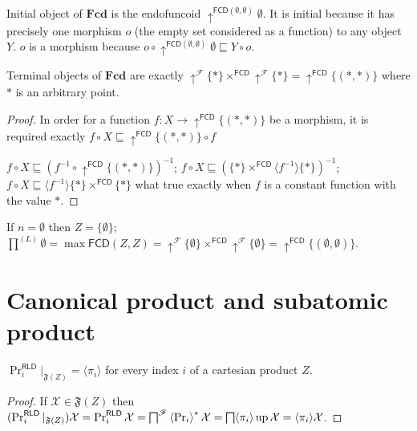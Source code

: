 Initial object of $\mathbf{Fcd}$ is the endofuncoid
$\uparrow^{\mathsf{FCD} (\emptyset , \emptyset)} \emptyset$. It is
initial because it has precisely one morphism $o$ (the empty set considered as
a function) to any object $Y$. $o$ is a morphism because $o \circ
\uparrow^{\mathsf{FCD} (\emptyset , \emptyset)} \emptyset \sqsubseteq Y
\circ o$.

\begin{prop}
  Terminal objects of $\mathbf{Fcd}$ are exactly
  $\uparrow^{\mathscr{F}} \{ \ast \} \times^{\mathsf{FCD}}
  \uparrow^{\mathscr{F}} \{ \ast \} = \uparrow^{\mathsf{FCD}} \{ (\ast
  , \ast) \}$ where $\ast$ is an arbitrary point.
\end{prop}

\begin{proof}
  In order for a function $f : X \rightarrow \uparrow^{\mathsf{FCD}} \{
  (\ast , \ast) \}$ be a morphism, it is required exactly $f \circ X
  \sqsubseteq \uparrow^{\mathsf{FCD}} \{ (\ast , \ast) \} \circ f$
  
  $f \circ X \sqsubseteq (f^{- 1} \circ \uparrow^{\mathsf{FCD}} \{
  (\ast , \ast) \})^{- 1}$; $f \circ X \sqsubseteq (\{ \ast \}
  \times^{\mathsf{FCD}} \langle f^{- 1} \rangle \{ \ast \})^{- 1}$; $f
  \circ X \sqsubseteq \langle f^{- 1} \rangle \{ \ast \}
  \times^{\mathsf{FCD}} \{ \ast \}$ what true exactly when $f$ is a
  constant function with the value $\ast$.
\end{proof}

If $n = \emptyset$ then $Z = \{ \emptyset \}$; $\prod^{(L)} \emptyset = \max
\mathsf{FCD} (Z , Z) = \uparrow^{\mathscr{F}} \{ \emptyset \}
\times^{\mathsf{FCD}} \uparrow^{\mathscr{F}} \{ \emptyset \} =
\uparrow^{\mathsf{FCD}} \{ (\emptyset , \emptyset) \}$.


\section{Canonical product and subatomic product}


\begin{prop}
  $\Pr^{\mathsf{RLD}}_i |_{\mathfrak{F} (Z)} = \langle \pi_i \rangle$
  for every index $i$ of a cartesian product $Z$.
\end{prop}

\begin{proof}
  If $\mathcal{X} \in \mathfrak{F} (Z)$ then $(\Pr^{\mathsf{RLD}}_i
  |_{\mathfrak{F} (Z)}) \mathcal{X} = \Pr^{\mathsf{RLD}}_i  \mathcal{X}
  = \bigsqcap^{\mathscr{F}} \left\langle \Pr_i\right\rangle ^{\ast} \mathcal{X} =
  \bigsqcap \langle \pi_i \rangle \operatorname{up} \mathcal{X} = \langle \pi_i
  \rangle \mathcal{X}$.
\end{proof}


